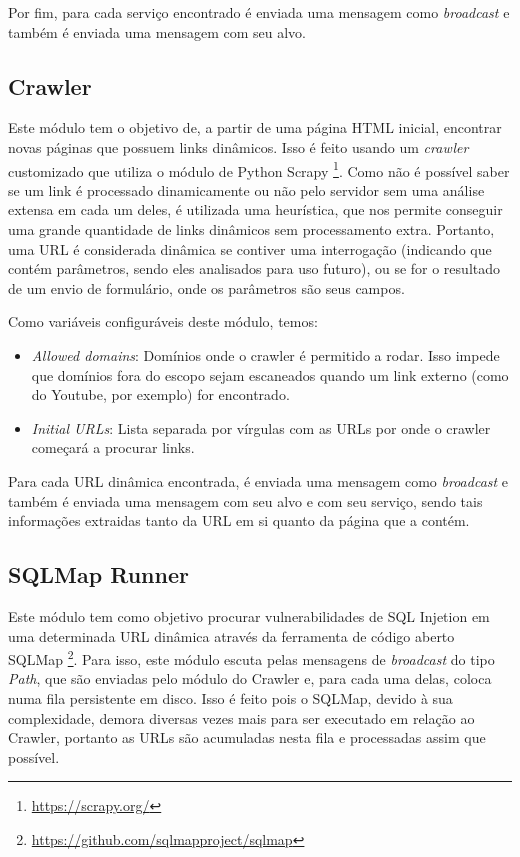     Por fim, para cada serviço encontrado é enviada uma mensagem como \textit{broadcast} e também é enviada uma mensagem com seu alvo.
    
    \subsection{Crawler}
    Este módulo tem o objetivo de, a partir de uma página HTML inicial, encontrar novas páginas que possuem links dinâmicos. Isso é feito usando um \textit{crawler} customizado que utiliza o módulo de Python Scrapy \footnote{\url{https://scrapy.org/}}. Como não é possível saber se um link é processado dinamicamente ou não pelo servidor sem uma análise extensa em cada um deles, é utilizada uma heurística, que nos permite conseguir uma grande quantidade de links dinâmicos sem processamento extra. Portanto, uma URL é considerada dinâmica se contiver uma interrogação (indicando que contém parâmetros, sendo eles analisados para uso futuro), ou se for o resultado de um envio de formulário, onde os parâmetros são seus campos. 
    
    Como variáveis configuráveis deste módulo, temos:
    \begin{itemize}
        \item \emph{Allowed domains}: Domínios onde o crawler é permitido a rodar. Isso impede que domínios fora do escopo sejam escaneados quando um link externo (como do Youtube, por exemplo) for encontrado.
        \item \emph{Initial URLs}: Lista separada por vírgulas com as URLs por onde o crawler começará a procurar links. 
    \end{itemize}
    
    Para cada URL dinâmica encontrada, é enviada uma mensagem como \textit{broadcast} e também é enviada uma mensagem com seu alvo e com seu serviço, sendo tais informações extraidas tanto da URL em si quanto da página que a contém.
    
    \subsection{SQLMap Runner}
    Este módulo tem como objetivo procurar vulnerabilidades de SQL Injetion em uma determinada URL dinâmica através da ferramenta de código aberto SQLMap \footnote{\url{https://github.com/sqlmapproject/sqlmap}}. Para isso, este módulo escuta pelas mensagens de \textit{broadcast} do tipo \textit{Path}, que são enviadas pelo módulo do Crawler e, para cada uma delas, coloca numa fila persistente em disco. Isso é feito pois o SQLMap, devido à sua complexidade, demora diversas vezes mais para ser executado em relação ao Crawler, portanto as URLs são acumuladas nesta fila e processadas assim que possível.
    
